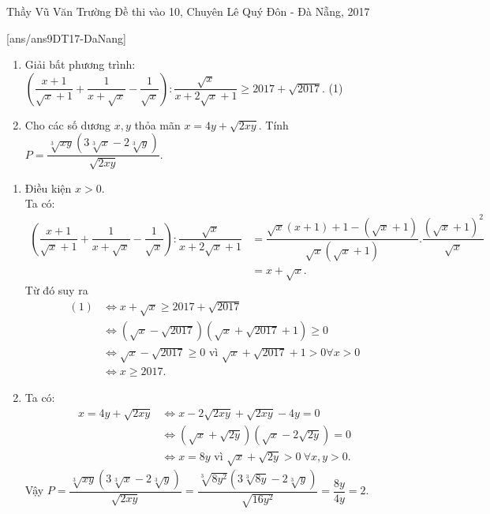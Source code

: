 \begin{name}
{Thầy  Vũ Văn Trường}
{Đề thi vào 10, Chuyên Lê Quý Đôn - Đà Nẵng, 2017}
\end{name}
\setcounter{ex}{0}
[ans/ans9DT17-DaNang]
\begin{ex}%
    \hfill
    \begin{enumerate}
        \item Giải bất phương trình: $\left(\dfrac{x+1}{\sqrt{x}+1}+\dfrac{1}{x+\sqrt{x}}-\dfrac{1}{\sqrt{x}}\right):\dfrac{\sqrt{x}}{x+2\sqrt{x}+1}\geq 2017+\sqrt{2017}.$ \hfill (1)
        \item Cho các số dương $x, y$ thỏa mãn $x=4y+\sqrt{2xy}$. Tính $P=\dfrac{\sqrt[3]{xy}\left(3\sqrt[3]{x}-2\sqrt[3]{y}\right)}{\sqrt{2xy}}.$
    \end{enumerate}
\loigiai
    {
    \begin{enumerate}
        \item Điều kiện $x>0.$\\
        Ta có: \begin{align*}
                 \left(\dfrac{x+1}{\sqrt{x}+1}+\dfrac{1}{x+\sqrt{x}}-\dfrac{1}{\sqrt{x}}\right):\dfrac{\sqrt{x}}{x+2\sqrt{x}+1}&=\dfrac{\sqrt{x}(x+1)+1-(\sqrt{x}+1)}{\sqrt{x}(\sqrt{x}+1)}.\dfrac{\left(\sqrt{x}+1\right)^2}{\sqrt{x}} \\
                 &=x+\sqrt{x}.
               \end{align*}
        Từ đó suy ra
        \begin{align*}
                 (1)&\Leftrightarrow x+\sqrt{x}\geq 2017+\sqrt{2017}\\
                 &\Leftrightarrow\left(\sqrt{x}-\sqrt{2017}\right)\left(\sqrt{x}+\sqrt{2017}+1\right)\geq 0\\
                 &\Leftrightarrow\sqrt{x}-\sqrt{2017}\geq 0 \text{ vì } \sqrt{x}+\sqrt{2017}+1> 0 \forall x>0\\
                  &\Leftrightarrow x\geq 2017.
        \end{align*}
                \item Ta có:
                 \begin{align*}
                 x=4y+\sqrt{2xy}&\Leftrightarrow x-2\sqrt{2xy}+\sqrt{2xy}-4y=0\\
                 &\Leftrightarrow\left(\sqrt{x}+\sqrt{2y}\right)\left(\sqrt{x}-2\sqrt{2y}\right)=0\\
                 &\Leftrightarrow x=8y \text{ vì } \sqrt{x}+\sqrt{2y}> 0\  \forall x, y>0.
        \end{align*}
        Vậy $P=\dfrac{\sqrt[3]{xy}\left(3\sqrt[3]{x}-2\sqrt[3]{y}\right)}{\sqrt{2xy}}=\dfrac{\sqrt[3]{8y^2}\left(3\sqrt[3]{8y}-2\sqrt[3]{y}\right)}{\sqrt{16y^2}}=\dfrac{8y}{4y}=2.$
    \end{enumerate}
    }
\end{ex}


